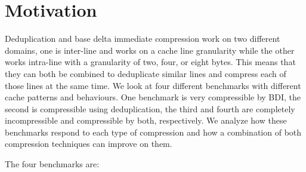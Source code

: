\section{Motivation}
\label{sec:Motivation}
Deduplication and base delta immediate compression work on two different domains, one is inter-line and works on a cache line granularity while the other works intra-line with a granularity of two, four, or eight bytes. This means that they can both be combined to deduplicate similar lines and compress each of those lines at the same time.
We look at four different benchmarks with different cache patterns and behaviours. One benchmark is very compressible by BDI, the second is compressible using deduplication, the third and fourth are completely incompressible and compressible by both, respectively. We analyze how these benchmarks respond to each type of compression and how a combination of both compression techniques can improve on them.\par
The four benchmarks are:
